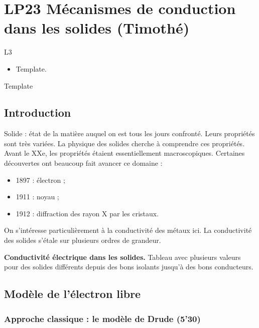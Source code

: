 \section{LP23 Mécanismes de conduction dans les solides (Timothé)}

\niveau L3

\prerequis
\begin{itemize}
\item Template.
\end{itemize}

\objectif Template

\footnotesize{}

\subsection{Introduction}

Solide : état de la matière auquel on est tous les jours confronté.
Leurs propriétés sont très variées.
La physique des solides cherche à comprendre ces propriétés.
Avant le XXe, les propriétés étaient essentiellement macroscopiques.
Certaines découvertes ont beaucoup fait avancer ce domaine :
\begin{itemize}
\item 1897 : électron ;
\item 1911 : noyau ;
\item 1912 : diffraction des rayon X par les cristaux.
\end{itemize}

On s'intéresse particulièrement à la conductivité des métaux ici.
La conductivité des solides s'étale sur plusieurs ordres de grandeur.
\begin{slide}
\textbf{Conductivité électrique dans les solides.}
Tableau avec plusieurs valeurs pour des solides différents depuis des bons isolants jusqu'à des bons conducteurs.
\end{slide}

\subsection{Modèle de l'électron libre}

\subsubsection{Approche classique : le modèle de Drude (5'30)}

